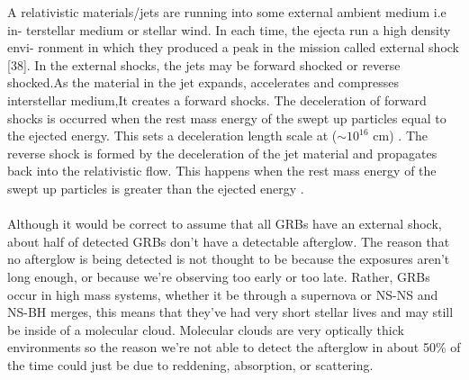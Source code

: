 A relativistic materials/jets are running into some external ambient medium i.e in-
terstellar medium or stellar wind. In each time, the ejecta run a high density envi-
ronment in which they produced a peak in the mission called external shock [38]. In
the external shocks, the jets may be forward shocked or reverse shocked.As the material in the jet expands, accelerates and compresses interstellar medium,It creates a forward shocks. The deceleration of forward shocks is occurred when the rest mass energy of the swept up particles equal to the ejected energy. This sets a deceleration length scale at ($\sim  10^{16} $ cm) . The reverse shock is formed by the deceleration of the jet material and propagates back into the relativistic flow. This happens when the rest mass energy of the swept up particles is greater than the ejected energy \citep{20}.\\\\
Although it would be correct to assume that all GRBs have an external shock, about half of detected GRBs don't have a detectable afterglow. The reason that no afterglow is being detected is not thought to be because the exposures aren't long enough, or because we're observing too early or too late. Rather, GRBs occur in high mass systems, whether it be through a supernova or NS-NS and NS-BH merges, this means that they've had very short stellar lives and may still be inside of a molecular cloud. Molecular clouds are very optically thick environments so the reason we're not able to detect the afterglow in about 50\%  of the time could just be due to reddening, absorption, or scattering.
